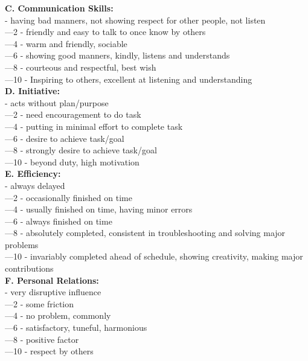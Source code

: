 \documentclass[11pt]{article}
\begin{document}
\textbf{C. Communication Skills:}\\
	\indent{}	- having bad manners, not showing respect for other people, not listen\\
	\indent{}—2	- friendly and easy to talk to once know by others\\
	\indent{}—4	- warm and friendly, sociable\\
	\indent{}—6	- showing good manners, kindly, listens and understands\\
	\indent{}—8	- courteous and respectful, best wish\\ 
	\indent{}—10	- Inspiring to others, excellent at listening and understanding\\

\textbf{D. Initiative:}\\
	\indent{}	- acts without plan/purpose\\
	\indent{}—2	- need encouragement to do task\\
	\indent{}—4	- putting in minimal effort to complete task\\
	\indent{}—6	- desire to achieve task/goal\\
	\indent{}—8	- strongly desire to achieve task/goal\\
	\indent{}—10	- beyond duty, high motivation\\

\textbf{E. Efficiency:}\\
	\indent{}	- always delayed\\
	\indent{}—2	- occasionally finished on time\\  
	\indent{}—4	- usually finished on time, having minor errors\\
	\indent{}—6	- always finished on time\\
	\indent{}—8	- absolutely completed, consistent in troubleshooting and solving major problems\\ 
	\indent{}—10	- invariably completed ahead of schedule, showing creativity, making major contributions\\ 

\textbf{F. Personal Relations:}\\
	\indent{}	- very disruptive influence\\
	\indent{}—2	- some friction\\
	\indent{}—4	- no problem, commonly\\
	\indent{}—6	- satisfactory, tuneful, harmonious\\ 
	\indent{}—8	- positive factor\\
	\indent{}—10	- respect by others\\
\end{document}
